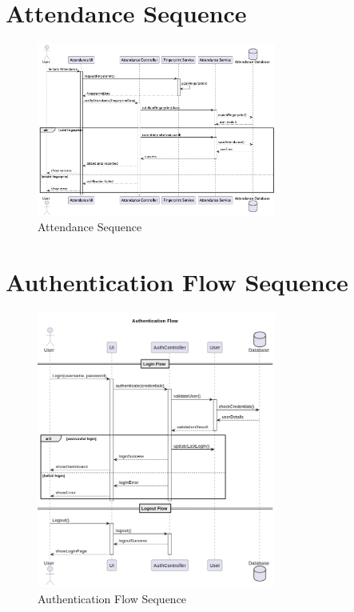 \documentclass[12pt,a4paper]{report}
\begin{document}
\section{Attendance Sequence}
\begin{figure}[htbp]
    \centering
    \includegraphics[width=0.7\textwidth]{attendance-sequence.png}
    \caption{Attendance Sequence}
    \label{fig:attendance-sequence}
\end{figure}

\section{Authentication Flow Sequence}
\begin{figure}[htbp]
    \centering
    \includegraphics[width=0.7\textwidth]{authentication-flow-sequence.png}
    \caption{Authentication Flow Sequence}
    \label{fig:authentication-flow-sequence}
\end{figure}
\end{document}
